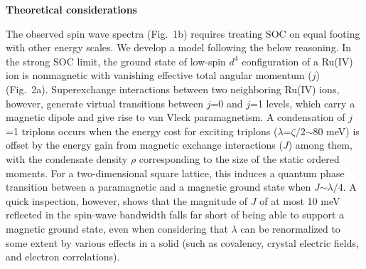 \vspace{ 10 pt}
\noindent
{\bf Theoretical considerations}

\noindent
The observed spin wave spectra (Fig.~1b) requires treating SOC on equal footing with other energy scales. We develop a model following the below reasoning. In the strong SOC limit, the ground state of low-spin $d^4$ configuration of a Ru(IV) ion is nonmagnetic with vanishing effective total angular momentum ($j$) (Fig.~2a). Superexchange interactions between two neighboring Ru(IV) ions, however, generate virtual transitions between $j$=0 and $j$=1 levels, which carry a magnetic dipole and give rise to van Vleck paramagnetism. A condensation of $j$=1 triplons occurs when the energy cost for exciting triplons ($\lambda$=$\zeta/2$$\sim$80 meV) is offset by the energy gain from magnetic exchange interactions ($J$) among them, with the condensate density $\rho$ corresponding to the size of the static ordered moments. For a two-dimensional square lattice, this induces a quantum phase transition between a paramagnetic and a magnetic ground state when $J$$\sim$$\lambda/4$. A quick inspection, however, shows that the magnitude of $J$ of at most 10 meV reflected in the spin-wave bandwidth falls far short of being able to support a magnetic ground state, even when considering that $\lambda$ can be renormalized to some extent by various effects in a solid (such as covalency, crystal electric fields, and electron correlations). 

